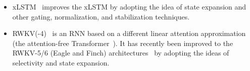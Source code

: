 \begin{itemize}[leftmargin=*,itemsep=0pt,topsep=0pt]
  \item xLSTM~\citep{beck2024xlstm} improves the xLSTM by adopting the idea of state expansion and other gating, normalization, and stabilization techniques.

  \item RWKV(-4)~\citep{peng2023rwkv} is an RNN based on a different linear attention approximation (the attention-free Transformer~\citep{zhai2021attention}).
    It has recently been improved to the RWKV-5/6 (Eagle and Finch) architectures~\citep{peng2024eagle} by adopting the ideas of selectivity and state expansion.
\end{itemize}


